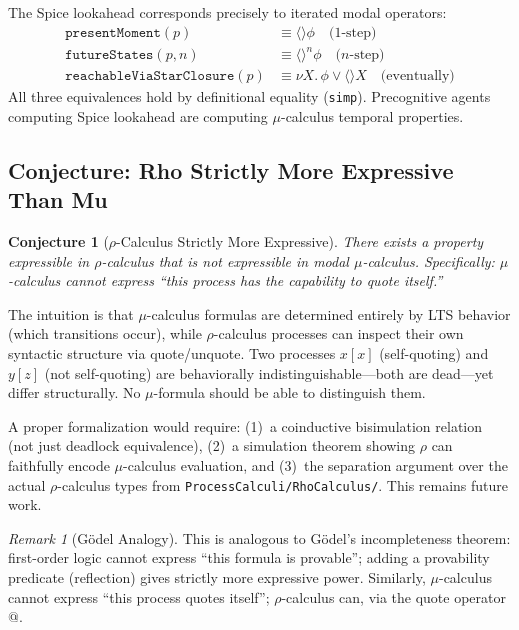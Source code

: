 \documentclass[11pt]{article}
\newtheorem{conjecture}[theorem]{Conjecture}
\theoremstyle{definition}
\theoremstyle{remark}
\newtheorem{remark}[theorem]{Remark}
\begin{document}
The Spice lookahead corresponds precisely to iterated modal operators:
\begin{align*}
  \texttt{presentMoment}(p) &\equiv \langle\rangle \phi \quad \text{(1-step)} \\
  \texttt{futureStates}(p, n) &\equiv \langle\rangle^n \phi \quad \text{($n$-step)} \\
  \texttt{reachableViaStarClosure}(p) &\equiv \nu X.\, \phi \lor \langle\rangle X \quad \text{(eventually)}
\end{align*}
All three equivalences hold by definitional equality (\texttt{simp}).
Precognitive agents computing Spice lookahead are computing
$\mu$-calculus temporal properties.

\subsection{Conjecture: Rho Strictly More Expressive Than Mu}
\label{sec:expressiveness}

\begin{conjecture}[$\rho$-Calculus Strictly More Expressive]
\label{conj:rho-mu-expressiveness}
There exists a property expressible in $\rho$-calculus that is not
expressible in modal $\mu$-calculus.  Specifically: $\mu$-calculus
cannot express ``this process has the capability to quote itself.''
\end{conjecture}

The intuition is that $\mu$-calculus formulas are determined entirely by
LTS behavior (which transitions occur), while $\rho$-calculus processes
can inspect their own syntactic structure via quote/unquote.  Two
processes $x[x]$ (self-quoting) and $y[z]$ (not self-quoting) are
behaviorally indistinguishable---both are dead---yet differ structurally.
No $\mu$-formula should be able to distinguish them.

A proper formalization would require: (1)~a coinductive bisimulation
relation (not just deadlock equivalence), (2)~a simulation theorem
showing $\rho$ can faithfully encode $\mu$-calculus evaluation, and
(3)~the separation argument over the actual $\rho$-calculus types from
\texttt{ProcessCalculi/RhoCalculus/}.  This remains future work.

\begin{remark}[G\"odel Analogy]
This is analogous to G\"odel's incompleteness theorem: first-order logic
cannot express ``this formula is provable''; adding a provability
predicate (reflection) gives strictly more expressive power.  Similarly,
$\mu$-calculus cannot express ``this process quotes itself'';
$\rho$-calculus can, via the quote operator $\mathsf{@}$.
\end{remark}
\end{document}
